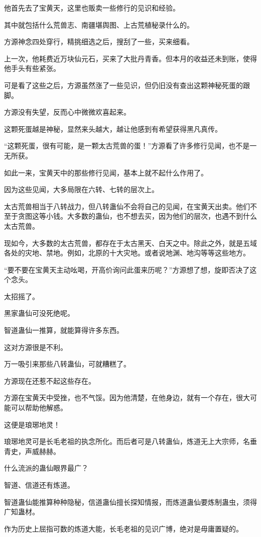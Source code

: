 \begin{this_body}
他首先去了宝黄天，这里也贩卖一些修行的见识和经验。

其中就包括什么荒兽志、南疆堪舆图、上古荒植秘录什么的。

方源神念四处穿行，精挑细选之后，搜刮了一些，买来细看。

上一次，他耗费近万块仙元石，买来了大批丹青香。但本月的收益还未到账，使得他手头有些紧张。

可是看了这些之后，方源虽然涨了一些见识，但仍旧没有查出这颗神秘死蛋的跟脚。

方源没有失望，反而心中微微欢喜起来。

这颗死蛋越是神秘，显然来头越大，越让他感到有希望获得黑凡真传。

“这颗死蛋，很有可能，是一颗太古荒兽的蛋！”方源看了许多修行见闻，也不是一无所获。

如此一来，宝黄天中的那些修行见闻，基本上就不起什么作用了。

因为这些见闻，大多局限在六转、七转的层次上。

太古荒兽相当于八转战力，但八转蛊仙不会将自己的见闻，在宝黄天出卖。他们不至于贪图这等小钱。大多数的蛊仙，也不想去买，因为他们的层次，也遇不到什么太古荒兽。

现如今，大多数的太古荒兽，都存在于太古黑天、白天之中。除此之外，就是五域各处的灾地、禁地。例如，北原的十大灾地。或者说地渊、地沟等等这些地方。

“要不要在宝黄天主动吆喝，开高价询问此蛋来历呢？”方源想了想，旋即否决了这个念头。

太招摇了。

黑家蛊仙可没死绝呢。

智道蛊仙一推算，就能算得许多东西。

这对方源很是不利。

万一吸引来那些八转蛊仙，可就糟糕了。

方源现在还惹不起这些存在。

方源在宝黄天中受挫，也不气馁。因为他清楚，在他身边，就有一个存在，很大可能可以帮助他解惑。

这便是琅琊地灵！

琅琊地灵可是长毛老祖的执念所化。而后者可是八转蛊仙，炼道无上大宗师，名垂青史，声威赫赫。

什么流派的蛊仙眼界最广？

智道、信道还有炼道。

智道蛊仙能推算种种隐秘，信道蛊仙擅长探知情报，而炼道蛊仙要炼制蛊虫，须得广知蛊材。

作为历史上屈指可数的炼道大能，长毛老祖的见识广博，绝对是毋庸置疑的。


\end{this_body}
